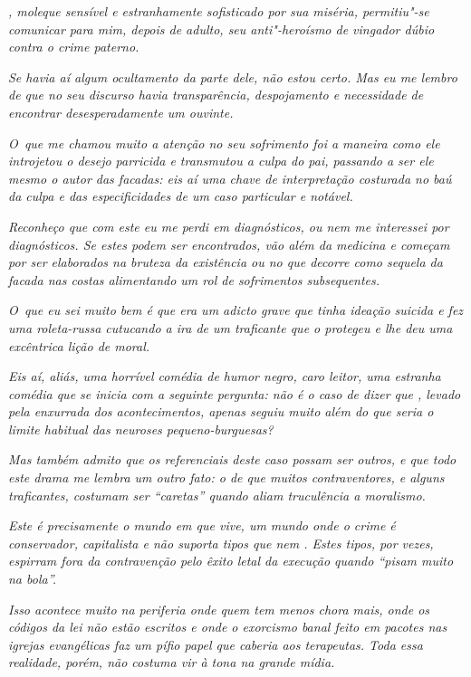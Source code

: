 \emph{, moleque sensível e estranhamente sofisticado por sua miséria,
permitiu"-se comunicar para mim, depois de adulto, seu anti"-heroísmo de
vingador dúbio contra o crime paterno.}

\emph{Se havia aí algum ocultamento da parte dele, não estou certo. Mas
eu me lembro de que no seu discurso havia transparência, despojamento e
necessidade de encontrar desesperadamente um ouvinte.}

\emph{O~que me chamou muito a atenção no seu sofrimento foi a maneira
como ele introjetou o desejo parricida e transmutou a culpa do pai,
passando a ser ele mesmo o autor das facadas: eis aí uma chave de
interpretação costurada no baú da culpa e das especificidades de um caso
particular e notável.}

\emph{Reconheço que com este  eu me perdi em diagnósticos, ou nem me
interessei por diagnósticos. Se estes podem ser encontrados, vão além da
medicina e começam por ser elaborados na bruteza da existência ou no que
decorre como sequela da facada nas costas alimentando um rol de
sofrimentos subsequentes.}

\emph{O~que eu sei muito bem é que  era um adicto grave que tinha
ideação suicida e fez uma roleta-russa cutucando a ira de um traficante
que o protegeu e lhe deu uma excêntrica lição de moral.}

\emph{Eis aí, aliás, uma horrível comédia de humor negro, caro leitor,
uma estranha comédia que se inicia com a seguinte pergunta: não é o caso
de dizer que , levado pela enxurrada dos acontecimentos, apenas seguiu
muito além do que seria o limite habitual das neuroses pequeno-burguesas?}

\emph{Mas também admito que os referenciais deste caso possam ser
outros, e que todo este drama me lembra um outro fato: o de que muitos
contraventores, e alguns traficantes, costumam ser ``caretas'' quando
aliam truculência a moralismo.}

\emph{Este é precisamente o mundo em que  vive, um mundo onde o crime
é conservador, capitalista e não suporta tipos que nem . Estes tipos,
por vezes, espirram fora da contravenção pelo êxito letal da execução
quando ``pisam muito na bola''.}

\emph{Isso acontece muito na periferia onde quem tem menos chora mais,
onde os códigos da lei não estão escritos e onde o exorcismo banal feito
em pacotes nas igrejas evangélicas faz um pífio papel que caberia aos
terapeutas. Toda essa realidade, porém, não costuma vir à tona na grande
mídia.}


